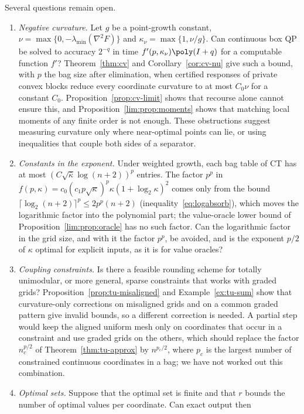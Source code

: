 Several questions remain open.
\begin{enumerate}[label=(\arabic*)]
\item \emph{Negative curvature.} Let $g$ be a point-growth constant,
$\nu=\max\{0,-\lambda_{\min}(\nabla^2F)\}$ and $\kappa_\nu=\max\{1,\nu/g\}$.
Can continuous box QP be solved to accuracy $2^{-q}$ in time
$f'(p,\kappa_\nu)\poly(I+q)$ for a computable function $f'$?
Theorem~\ref{thm:cv} and Corollary~\ref{cor:cv-nu} give such a bound, with
$p$ the bag size after elimination, when certified responses of private
convex blocks reduce every coordinate curvature to at most $C_0\nu$ for a
constant $C_0$.
Proposition~\ref{prop:cv-limit} shows that recourse alone cannot ensure this,
and Proposition~\ref{lim:prop:moments} shows that matching local moments of
any finite order is not enough. These obstructions suggest measuring
curvature only where near-optimal points can lie, or using inequalities that
couple both sides of a separator.
\item \emph{Constants in the exponent.} Under weighted growth, each bag
table of CT has at most
$(C\sqrt{\bar\kappa}\log(n+2))^p$ entries. The factor $p^p$ in
$f(p,\kappa)=c_0(c_1p\sqrt\kappa)^p\kappa(1+\log_2\kappa)^2$ comes only from
the bound $\lceil\log_2(n+2)\rceil^p\le2p^p(n+2)$
(inequality~\eqref{eq:logabsorb}), which moves the logarithmic factor into
the polynomial part; the value-oracle lower bound of
Proposition~\ref{lim:prop:oracle} has no such factor. Can the logarithmic
factor in the grid size, and with it the factor $p^p$, be avoided, and is the
exponent $p/2$ of $\kappa$ optimal for explicit inputs, as it is for value
oracles?
\item \emph{Coupling constraints.} Is there a feasible rounding scheme for
totally unimodular, or more general, sparse constraints that works with
graded grids? Proposition~\ref{prop:tu-misaligned} and
Example~\ref{ex:tu-sum} show that curvature-only corrections on misaligned
grids and on a common graded pattern give invalid bounds, so a different
correction is needed. A partial step would keep the aligned uniform mesh
only on coordinates that occur in a constraint and use graded grids on the
others, which should replace the factor $n_c^{p/2}$ of
Theorem~\ref{thm:tu-approx} by $n^{p_c/2}$, where $p_c$ is the largest number
of constrained continuous coordinates in a bag; we have not worked out this
combination.
\item \emph{Optimal sets.} Suppose that the optimal set is finite and that
$r$ bounds the number of optimal values per coordinate. Can exact output then

\end{enumerate}
